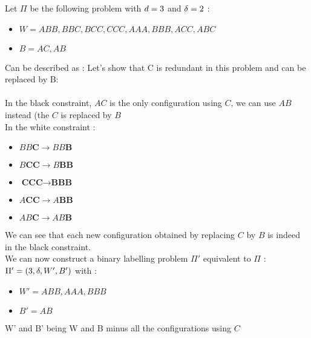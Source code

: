 \begin{exmp}
Let $\Pi$ be the following problem with $d = 3$ and $\delta = 2$ :
\begin{itemize}
    \item $W = ABB, BBC, BCC, CCC, AAA, BBB, ACC, ABC$
    \item $B = AC, AB$
\end{itemize}
Can be described as :
Let's show that C is redundant in this problem and can be replaced by B:\\\\
In the black constraint, $AC$ is the only configuration using $C$, we can use $AB$ instead (the $C$ is replaced by $B$\\
In the white constraint :
\begin{itemize}
    \item $BB\textbf{C} \rightarrow BB\textbf{B}$
    \item $B\textbf{CC} \rightarrow B\textbf{BB}$
    \item $\textbf{CCC} \rightarrow \textbf{BBB}$
    \item $A\textbf{CC} \rightarrow A\textbf{BB}$
    \item $AB\textbf{C} \rightarrow AB\textbf{B}$
\end{itemize}
We can see that each new configuration obtained by replacing $C$ by $B$ is indeed in the black constraint.\\
We can now construct a binary labelling problem $\Pi'$ equivalent to $\Pi$ :\\
$\Pi'=(3,\delta,W',B')$ with :
\begin{itemize}
    \item $W' = ABB, AAA, BBB$
    \item $B' = AB$
\end{itemize}
W' and B' being W and B minus all the configurations using $C$
\end{exmp}